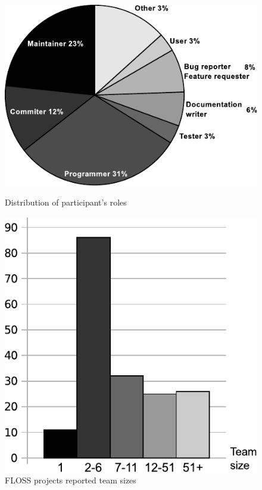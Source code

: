 \documentclass[lnbip]{svmultln}
\begin{document}
\begin{figure}[htb]
  \begin{minipage}[t]{0.5\linewidth}
    \includegraphics[scale=0.8]{floss-roles.pdf}
    \caption{Distribution of participant's roles}
    \label{fig:floss-roles}
  \end{minipage}
  \begin{minipage}[t]{0.5\linewidth}
    \begin{flushright}
      \includegraphics[scale=0.65]{floss-teams.pdf}
      \caption{FLOSS projects reported team sizes}
      \label{fig:floss-teams}
    \end{flushright}
  \end{minipage}
\end{figure}
\end{document}
